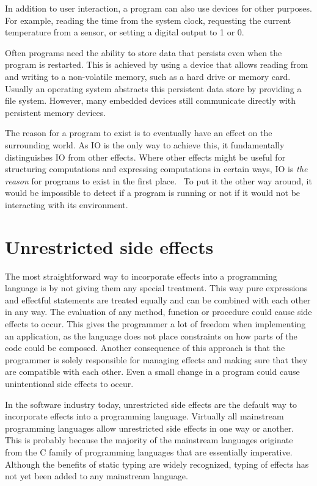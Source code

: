 In addition to user interaction, a program can also use devices for other purposes. For example, reading the time from the system clock, requesting the current temperature from a sensor, or setting a digital output to 1 or 0.

Often programs need the ability to store data that persists even when the program is restarted. This is achieved by using a device that allows reading from and writing to a non-volatile memory, such as a hard drive or memory card. Usually an operating system abstracts this persistent data store by providing a file system. However, many embedded devices still communicate directly with persistent memory devices.

The reason for a program to exist is to eventually have an effect on the surrounding world. As IO is the only way to achieve this, it fundamentally distinguishes IO from other effects. Where other effects might be useful for structuring computations and expressing computations in certain ways, IO is \textit{the reason} for programs to exist in the first place.~\cite{akward-squad} To put it the other way around, it would be impossible to detect if a program is running or not if it would not be interacting with its environment.


\section{Unrestricted side effects}
The most straightforward way to incorporate effects into a programming language is by not giving them any special treatment. This way pure expressions and effectful statements are treated equally and can be combined with each other in any way. The evaluation of any method, function or procedure could cause side effects to occur. This gives the programmer a lot of freedom when implementing an application, as the language does not place constraints on how parts of the code could be composed. Another consequence of this approach is that the programmer is solely responsible for managing effects and making sure that they are compatible with each other. Even a small change in a program could cause unintentional side effects to occur.

In the software industry today, unrestricted side effects are the default way to incorporate effects into a programming language. Virtually all mainstream programming languages allow unrestricted side effects in one way or another. This is probably because the majority of the mainstream languages originate from the C family of programming languages that are essentially imperative. Although the benefits of static typing are widely recognized, typing of effects has not yet been added to any mainstream language.


